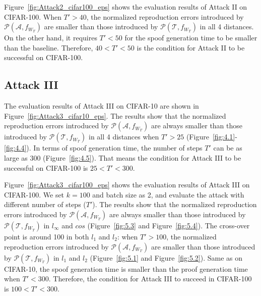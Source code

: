 \documentclass[conference]{IEEEtran}
\newcommand{\Prov}{\mathcal{T}\xspace}
\newcommand{\Adv}{\mathcal{A}\xspace}
\newcommand{\Proof}{\mathcal{P}\xspace}
\newcommand{\fig}{\textrm{Figure}\xspace}
\begin{document}
\fig~\ref{fig:Attack2_cifar100_eps} shows the evaluation results of Attack II on CIFAR-100.
When $T'>40$, the normalized reproduction errors introduced by $\Proof(\Adv, f_{W_T})$ are smaller than those introduced by $\Proof(\Prov, f_{W_T})$ in all 4 distances.
On the other hand, it requires $T'<50$ for the {spoof\EndAccSupp{}} generation time to be smaller than the baseline.
Therefore, $40<T'<50$ is the condition for Attack II to be successful on CIFAR-100.




















\subsection{Attack III}


The evaluation results of Attack III on CIFAR-10 are {shown\EndAccSupp{}} in \fig~\ref{fig:Attack3_cifar10_eps}. 
The results show that the normalized reproduction errors introduced by $\Proof(\Adv, f_{W_T})$ are always smaller than those introduced by $\Proof(\Prov, f_{W_T})$ in all 4 distances when $T'>25$ (\fig~\ref{fig:4.1}-\ref{fig:4.4}).
In {terms\EndAccSupp{}} of {spoof\EndAccSupp{}} generation time, the number of steps $T'$ can be as large as 300 (\fig~\ref{fig:4.5}).
That means the condition for Attack III to be successful on CIFAR-100 is $25<T'<300$.


\fig~\ref{fig:Attack3_cifar100_eps} shows the evaluation results of Attack III on CIFAR-100. 
We set $k=100$ and batch size as 2, and evaluate the attack with different number of steps ($T'$).
The results show that the normalized reproduction errors introduced by $\Proof(\Adv, f_{W_T})$ are always smaller than those introduced by $\Proof(\Prov, f_{W_T})$ in $l_{\infty}$ and $cos$ (\fig~\ref{fig:5.3} and \fig~\ref{fig:5.4}).
The cross-over point is around 100 in both $l_1$ and $l_2$: when $T'>100$, the normalized reproduction errors introduced by $\Proof(\Adv, f_{W_T})$ are smaller than those introduced by $\Proof(\Prov, f_{W_T})$ in $l_1$ and $l_2$ (\fig~\ref{fig:5.1} and \fig~\ref{fig:5.2}).
Same as on CIFAR-10, the {spoof\EndAccSupp{}} generation time is smaller than the proof generation time when $T'<300$.
Therefore, the condition for Attack III to succeed in CIFAR-100 is $100<T'<300$.
\end{document}
